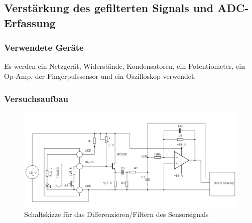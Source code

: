 \documentclass[12pt,a4paper]{article}
\begin{document}
\subsection{Verstärkung des gefilterten Signals und ADC-Erfassung}



\subsubsection*{Verwendete Geräte}

Es werden ein Netzgerät, Widerstände, Kondensatoren, ein Potentiometer, ein Op-Amp, der Fingerpulssensor und ein Oszilloskop verwendet.

\subsubsection*{Versuchsaufbau}

\begin{figure}[H] 
	\centering
	\includegraphics[scale = 0.3]{auf_3.png}
	\caption[Schaltskizze für das Differenzieren/Filtern des Sensorsignals]{Schaltskizze für das Differenzieren/Filtern des Sensorsignals\footnotemark}
	\label{fig:auf_3}
\end{figure}
\end{document}

